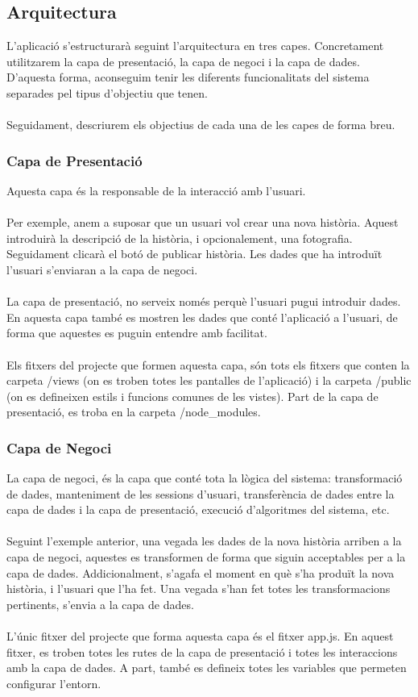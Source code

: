 \documentclass[11pt,catalan,listoffigures,listoftables]{tfgetsinf}
\begin{document}
\subsection{Arquitectura}
L'aplicació s'estructurarà seguint l'arquitectura en tres capes. Concretament utilitzarem la capa de presentació, la capa de negoci i la capa de dades. D'aquesta forma, aconseguim tenir les diferents funcionalitats del sistema separades pel tipus d'objectiu que tenen.\\ \\
Seguidament, descriurem els objectius de cada una de les capes de forma breu.

\subsubsection{Capa de Presentació}

Aquesta capa és la responsable de la interacció amb l'usuari. \\ \\
Per exemple, anem a suposar que un usuari vol crear una nova història. Aquest introduirà la descripció de la història, i opcionalement, una fotografia. Seguidament clicarà el botó de publicar història. Les dades que ha introduït l'usuari s'enviaran a la capa de negoci.\\ \\
La capa de presentació, no serveix només perquè l'usuari pugui introduir dades. En aquesta capa també es mostren les dades que conté l'aplicació a l'usuari, de forma que aquestes es puguin entendre amb facilitat.\\ \\
Els fitxers del projecte que formen aquesta capa, són tots els fitxers que conten la carpeta /views (on es troben totes les pantalles de l'aplicació) i la carpeta /public (on es defineixen estils i funcions comunes de les vistes). Part de la capa de presentació, es troba en la carpeta /node\_modules.

\subsubsection{Capa de Negoci}

La capa de negoci, és la capa que conté tota la lògica del sistema: transformació de dades, manteniment de les sessions d'usuari, transferència de dades entre la capa de dades i la capa de presentació, execució d'algoritmes del sistema, etc. \\ \\
Seguint l'exemple anterior, una vegada les dades de la nova història arriben a la capa de negoci, aquestes es transformen de forma que siguin acceptables per a la capa de dades. Addicionalment, s'agafa el moment en què s'ha produït la nova història, i l'usuari que l'ha fet. Una vegada s'han fet totes les transformacions pertinents, s'envia a la capa de dades.\\ \\
L'únic fitxer del projecte que forma aquesta capa és el fitxer app.js. En aquest fitxer, es troben totes les rutes de la capa de presentació i totes les interaccions amb la capa de dades. A part, també es defineix totes les variables que permeten configurar l'entorn.
\end{document}
